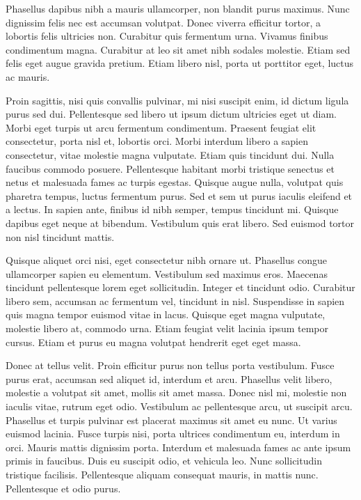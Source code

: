\documentclass{amsbook}
\begin{document}
Phasellus dapibus nibh a mauris ullamcorper, non blandit purus maximus. Nunc dignissim felis nec est accumsan volutpat. Donec viverra efficitur tortor, a lobortis felis ultricies non. Curabitur quis fermentum urna. Vivamus finibus condimentum magna. Curabitur at leo sit amet nibh sodales molestie. Etiam sed felis eget augue gravida pretium. Etiam libero nisl, porta ut porttitor eget, luctus ac mauris.

Proin sagittis, nisi quis convallis pulvinar, mi nisi suscipit enim, id dictum ligula purus sed dui. Pellentesque sed libero ut ipsum dictum ultricies eget ut diam. Morbi eget turpis ut arcu fermentum condimentum. Praesent feugiat elit consectetur, porta nisl et, lobortis orci. Morbi interdum libero a sapien consectetur, vitae molestie magna vulputate. Etiam quis tincidunt dui. Nulla faucibus commodo posuere. Pellentesque habitant morbi tristique senectus et netus et malesuada fames ac turpis egestas. Quisque augue nulla, volutpat quis pharetra tempus, luctus fermentum purus. Sed et sem ut purus iaculis eleifend et a lectus. In sapien ante, finibus id nibh semper, tempus tincidunt mi. Quisque dapibus eget neque at bibendum. Vestibulum quis erat libero. Sed euismod tortor non nisl tincidunt mattis.

Quisque aliquet orci nisi, eget consectetur nibh ornare ut. Phasellus congue ullamcorper sapien eu elementum. Vestibulum sed maximus eros. Maecenas tincidunt pellentesque lorem eget sollicitudin. Integer et tincidunt odio. Curabitur libero sem, accumsan ac fermentum vel, tincidunt in nisl. Suspendisse in sapien quis magna tempor euismod vitae in lacus. Quisque eget magna vulputate, molestie libero at, commodo urna. Etiam feugiat velit lacinia ipsum tempor cursus. Etiam et purus eu magna volutpat hendrerit eget eget massa.

Donec at tellus velit. Proin efficitur purus non tellus porta vestibulum. Fusce purus erat, accumsan sed aliquet id, interdum et arcu. Phasellus velit libero, molestie a volutpat sit amet, mollis sit amet massa. Donec nisl mi, molestie non iaculis vitae, rutrum eget odio. Vestibulum ac pellentesque arcu, ut suscipit arcu. Phasellus et turpis pulvinar est placerat maximus sit amet eu nunc. Ut varius euismod lacinia. Fusce turpis nisi, porta ultrices condimentum eu, interdum in orci. Mauris mattis dignissim porta. Interdum et malesuada fames ac ante ipsum primis in faucibus. Duis eu suscipit odio, et vehicula leo. Nunc sollicitudin tristique facilisis. Pellentesque aliquam consequat mauris, in mattis nunc. Pellentesque et odio purus.
\end{document}
